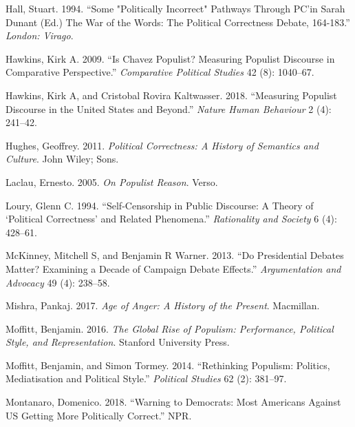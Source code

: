 \documentclass[smallextended]{svjour3}       %
\newlength{\cslhangindent}
\newlength{\cslentryspacingunit} %
\newenvironment{CSLReferences}[2] %
 {%
  \setlength{\parindent}{0pt}
  \ifodd #1
  \let\oldpar\par
  \def\par{\hangindent=\cslhangindent\oldpar}
  \fi
  \setlength{\parskip}{#2\cslentryspacingunit}
 }%
 {}
\begin{document}
\begin{CSLReferences}{1}{0}
\leavevmode{}%
Hall, Stuart. 1994. {``Some "Politically Incorrect" Pathways Through
PC'in Sarah Dunant (Ed.) The War of the Words: The Political Correctness
Debate, 164-183.''} \emph{London: Virago}.

\leavevmode{}%
Hawkins, Kirk A. 2009. {``Is Chavez Populist? Measuring Populist
Discourse in Comparative Perspective.''} \emph{Comparative Political
Studies} 42 (8): 1040--67.

\leavevmode{}%
Hawkins, Kirk A, and Cristobal Rovira Kaltwasser. 2018. {``Measuring
Populist Discourse in the United States and Beyond.''} \emph{Nature
Human Behaviour} 2 (4): 241--42.

\leavevmode{}%
Hughes, Geoffrey. 2011. \emph{Political Correctness: A History of
Semantics and Culture}. John Wiley; Sons.

\leavevmode{}%
Laclau, Ernesto. 2005. \emph{On Populist Reason}. Verso.

\leavevmode{}%
Loury, Glenn C. 1994. {``Self-Censorship in Public Discourse: A Theory
of {`Political Correctness'} and Related Phenomena.''} \emph{Rationality
and Society} 6 (4): 428--61.

\leavevmode{}%
McKinney, Mitchell S, and Benjamin R Warner. 2013. {``Do Presidential
Debates Matter? Examining a Decade of Campaign Debate Effects.''}
\emph{Argumentation and Advocacy} 49 (4): 238--58.

\leavevmode{}%
Mishra, Pankaj. 2017. \emph{Age of Anger: A History of the Present}.
Macmillan.

\leavevmode{}%
Moffitt, Benjamin. 2016. \emph{The Global Rise of Populism: Performance,
Political Style, and Representation}. Stanford University Press.

\leavevmode{}%
Moffitt, Benjamin, and Simon Tormey. 2014. {``Rethinking Populism:
Politics, Mediatisation and Political Style.''} \emph{Political Studies}
62 (2): 381--97.

\leavevmode{}%
Montanaro, Domenico. 2018. {``Warning to Democrats: Most Americans
Against US Getting More Politically Correct.''} NPR.


\end{CSLReferences}
\end{document}
